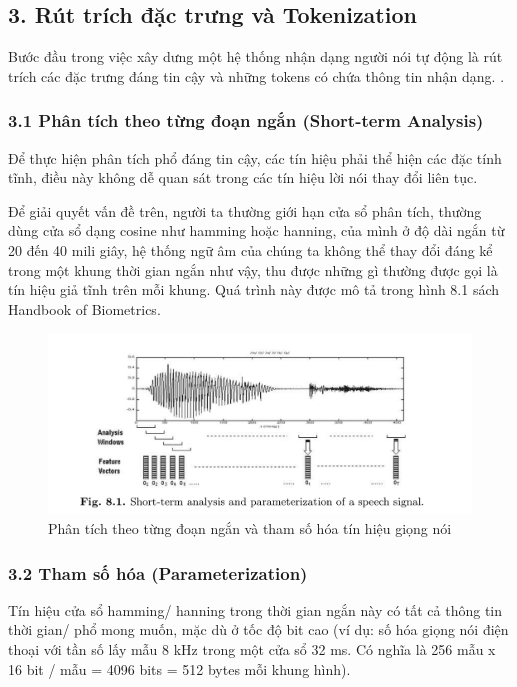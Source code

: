 \documentclass{article}
\begin{document}
	\subsection{3. Rút trích đặc trưng và Tokenization}
	\qquad Bước đầu trong việc xây dưng một hệ thống nhận dạng người nói tự động là rút trích các đặc trưng đáng tin cậy và những tokens có chứa thông tin nhận dạng. .
	
	\subsubsection{3.1 Phân tích theo từng đoạn ngắn (Short-term Analysis)}
	\qquad Để thực hiện phân tích phổ đáng tin cậy, các tín hiệu phải thể hiện các đặc tính tĩnh, điều này không dễ quan sát trong các tín hiệu lời nói thay đổi liên tục. 
	
	Để giải quyết vấn đề trên, người ta thường giới hạn cửa sổ phân tích, thường dùng cửa sổ dạng cosine như hamming hoặc hanning, của mình ở độ dài ngắn từ 20 đến 40 mili giây, hệ thống ngữ âm của chúng ta không thể thay đổi đáng kể trong một khung thời gian ngắn như vậy, thu được những gì thường được gọi là tín hiệu giả tĩnh trên mỗi khung. Quá trình này được mô tả trong hình 8.1 sách Handbook of Biometrics.
	
	\begin{figure}[H]
		\centering
		\includegraphics[width=1\linewidth]{images/figure_8_1.png}
		\caption{Phân tích theo từng đoạn ngắn và tham số hóa tín hiệu giọng nói}
		\label{fig:writing-thesis}
	\end{figure}

	\subsubsection{3.2 Tham số hóa (Parameterization)}
	\qquad Tín hiệu cửa sổ hamming/ hanning trong thời gian ngắn này có tất cả thông tin thời gian/ phổ mong muốn, mặc dù ở tốc độ bit cao (ví dụ: số hóa giọng nói điện thoại với tần số lấy mẫu 8 kHz trong một cửa sổ 32 ms. Có nghĩa là 256 mẫu x 16 bit / mẫu = 4096 bits = 512 bytes mỗi khung hình). 
	
\end{document}
